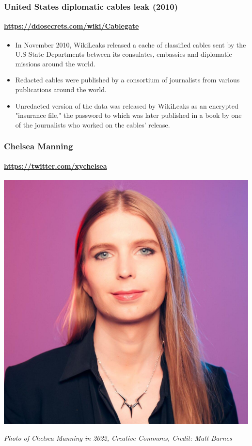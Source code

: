 \documentclass[aspectratio=169,usenames,dvipsnames]{beamer}
\begin{document}
\begin{frame}
  \frametitle{United States diplomatic cables leak (2010)}
  \framesubtitle{\url{https://ddosecrets.com/wiki/Cablegate}}

  \begin{itemize}[<+->]
    \item In November 2010, WikiLeaks released a cache of classified cables
      sent by the U.S State Departments between its consulates, embassies and
      diplomatic missions around the world.
    \item Redacted cables were published by a consortium of journalists from
      various publications around the world.
    \item Unredacted version of the data was released by WikiLeaks as an
      encrypted "insurance file," the password to which was later published in
      a book by one of the journalists who worked on the cables' release.
  \end{itemize}

\end{frame}

\begin{frame}[c]
  \frametitle{Chelsea Manning}
  \framesubtitle{\url{https://twitter.com/xychelsea}}

  \centering

  \includegraphics[width=\textwidth,height=0.75\textheight,keepaspectratio]{img/chelsea_manning.jpg}

  \footnotesize
  \emph{Photo of Chelsea Manning in 2022, Creative Commons, Credit: Matt
  Barnes}
\end{frame}
\end{document}
